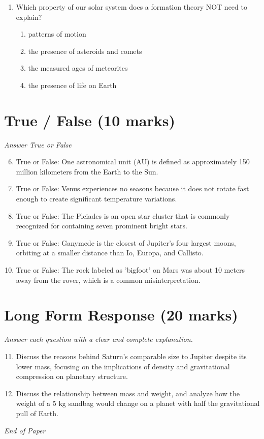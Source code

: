 \documentclass[12pt]{article}
\begin{document}
\begin{enumerate}[label=\arabic*.]
\begin{enumerate}[label=(\alph*)]
    \item the rigid rocky material of the crust and uppermost portion of the mantle.
\end{enumerate}
\item Which property of our solar system does a formation theory NOT need to explain?
\begin{enumerate}[label=(\alph*)]
    \item patterns of motion
    \item the presence of asteroids and comets
    \item the measured ages of meteorites
    \item the presence of life on Earth
\end{enumerate}
\end{enumerate}

\section*{True / False (10 marks)}
\textit{Answer True or False}
\begin{enumerate}[label=\arabic*.]
\setcounter{enumi}{5}
\item True or False: One astronomical unit (AU) is defined as approximately 150 million kilometers from the Earth to the Sun.
\item True or False: Venus experiences no seasons because it does not rotate fast enough to create significant temperature variations.
\item True or False: The Pleiades is an open star cluster that is commonly recognized for containing seven prominent bright stars.
\item True or False: Ganymede is the closest of Jupiter's four largest moons, orbiting at a smaller distance than Io, Europa, and Callisto.
\item True or False: The rock labeled as 'bigfoot' on Mars was about 10 meters away from the rover, which is a common misinterpretation.
\end{enumerate}

\section*{Long Form Response (20 marks)}
\textit{Answer each question with a clear and complete explanation.}
\begin{enumerate}[label=\arabic*.]
\setcounter{enumi}{10}
\item Discuss the reasons behind Saturn's comparable size to Jupiter despite its lower mass, focusing on the implications of density and gravitational compression on planetary structure.
\item Discuss the relationship between mass and weight, and analyze how the weight of a 5 kg sandbag would change on a planet with half the gravitational pull of Earth.
\end{enumerate}

\vfill
\noindent\textit{End of Paper}
\end{document}
